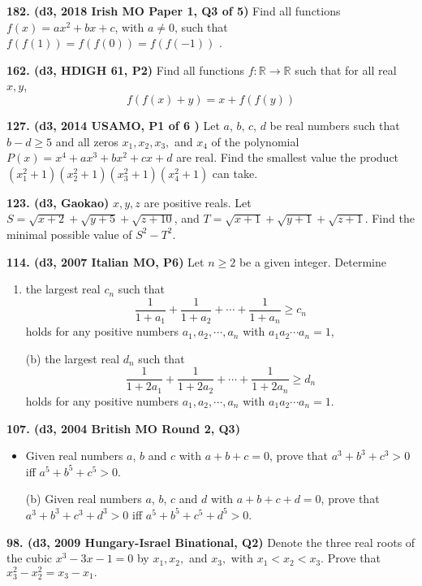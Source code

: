 \documentclass{article}
\begin{document}
\textbf{182. (\color{red}d3\color{black}, 2018 Irish MO Paper 1, Q3 of 5)} Find all functions $f(x) = ax^2 + bx + c$, with $a \ne 0$, such that $f(f(1)) = f(f(0)) = f(f(-1))$ .

\textbf{162. (\color{red}d3\color{black}, HDIGH 61, P2)} Find all functions $f:\mathbb{R}\to\mathbb{R}$ such that for all real $x,y$, $$f(f(x)+y)=x+f(f(y))$$

\textbf{127. (\color{red}d3\color{black}, 2014 USAMO,  P1 of 6    )} Let $a$, $b$, $c$, $d$ be real numbers such that $b-d \ge 5$ and all zeros $x_1, x_2, x_3,$ and $x_4$ of the polynomial $P(x)=x^4+ax^3+bx^2+cx+d$ are real. Find the smallest value the product $(x_1^2+1)(x_2^2+1)(x_3^2+1)(x_4^2+1)$ can take.

\textbf{123. (\color{red}d3\color{black}, Gaokao)} $x, y, z$ are positive reals. Let $S = \sqrt{x+2} + \sqrt{y+5} + \sqrt{z+10}$, and $T = \sqrt{x+1} + \sqrt{y+1} + \sqrt{z+1}$. Find the minimal possible value of $S^2 - T^2$.

\textbf{114. (\color{red}d3\color{black}, 2007 Italian MO, P6)} Let \(n \geq 2\) be a given integer. Determine
\begin{enumerate}
    \item the largest real \(c_n\) such that \[\frac{1}{1+a_1} + \frac{1}{1+a_2} + \cdots + \frac{1}{1+a_n} \geq c_n\] holds for any positive numbers \(a_1, a_2, \cdots, a_n\) with \(a_1a_2\cdots a_n = 1\),
    \item[(b)] the largest real \(d_n\) such that \[\frac{1}{1+2a_1} + \frac{1}{1+2a_2} + \cdots + \frac{1}{1+2a_n} \geq d_n\] holds for any positive numbers  \(a_1, a_2, \cdots, a_n\) with \(a_1a_2\cdots a_n = 1\).
\end{enumerate}

\textbf{107. (\color{red}d3\color{black}, 2004 British MO Round 2, Q3)} \begin{itemize}
    \item Given real numbers $a$, $b$ and $c$ with $a+b+c=0$, prove that $a^3+b^3+c^3>0$ iff $a^5+b^5+c^5>0$.
    \item[(b)] Given real numbers $a$, $b$, $c$ and $d$ with $a+b+c+d=0$, prove that $a^3+b^3+c^3+d^3>0$ iff $a^5+b^5+c^5+d^5>0$.
\end{itemize}

\textbf{98. (\color{red}d3\color{black}, 2009 Hungary-Israel Binational, Q2)} Denote the three real roots of the cubic \(x^3 - 3x - 1 = 0\) by \(x_1, x_2,\) and \(x_3,\) with \(x_1 < x_2 < x_3\). Prove that \(x_3^2 - x_2^2 = x_3 - x_1.\)
\end{document}
